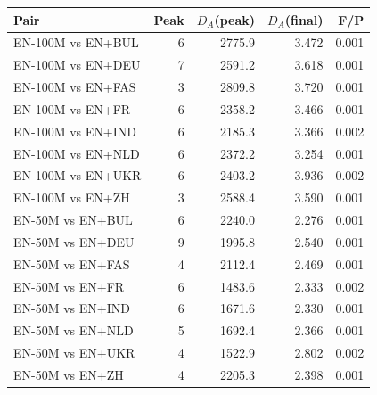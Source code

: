 \begin{tabular}{@{}lrrrr@{}}
\toprule
Pair & Peak & $D_A$(peak) & $D_A$(final) & F/P \\
\midrule
EN-100M vs EN+BUL & 6 & 2775.9 & 3.472 & 0.001 \\
EN-100M vs EN+DEU & 7 & 2591.2 & 3.618 & 0.001 \\
EN-100M vs EN+FAS & 3 & 2809.8 & 3.720 & 0.001 \\
EN-100M vs EN+FR & 6 & 2358.2 & 3.466 & 0.001 \\
EN-100M vs EN+IND & 6 & 2185.3 & 3.366 & 0.002 \\
EN-100M vs EN+NLD & 6 & 2372.2 & 3.254 & 0.001 \\
EN-100M vs EN+UKR & 6 & 2403.2 & 3.936 & 0.002 \\
EN-100M vs EN+ZH & 3 & 2588.4 & 3.590 & 0.001 \\
EN-50M vs EN+BUL & 6 & 2240.0 & 2.276 & 0.001 \\
EN-50M vs EN+DEU & 9 & 1995.8 & 2.540 & 0.001 \\
EN-50M vs EN+FAS & 4 & 2112.4 & 2.469 & 0.001 \\
EN-50M vs EN+FR & 6 & 1483.6 & 2.333 & 0.002 \\
EN-50M vs EN+IND & 6 & 1671.6 & 2.330 & 0.001 \\
EN-50M vs EN+NLD & 5 & 1692.4 & 2.366 & 0.001 \\
EN-50M vs EN+UKR & 4 & 1522.9 & 2.802 & 0.002 \\
EN-50M vs EN+ZH & 4 & 2205.3 & 2.398 & 0.001 \\
\bottomrule
\end{tabular}

